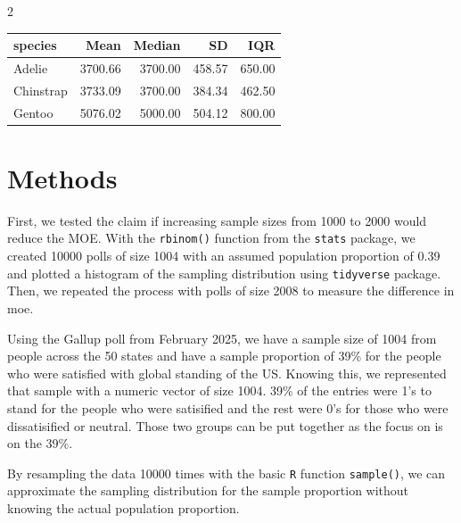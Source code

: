 \documentclass{article}\usepackage[]{graphicx}\usepackage[]{xcolor}
\newenvironment{Figure}
  {\par\medskip\noindent\minipage{\linewidth}}
  {\endminipage\par\medskip}
\begin{document}
\begin{multicols}{2}
\begin{Figure}
\centering
\begin{tabular}{lrrrr}
  \hline
species & Mean & Median & SD & IQR \\ 
  \hline
Adelie & 3700.66 & 3700.00 & 458.57 & 650.00 \\ 
  Chinstrap & 3733.09 & 3700.00 & 384.34 & 462.50 \\ 
  Gentoo & 5076.02 & 5000.00 & 504.12 & 800.00 \\ 
   \hline
\end{tabular}
\label{tab:penguins}
\end{Figure}

\section{Methods}
First, we tested the claim if increasing sample sizes from 1000 to 2000 would reduce the MOE. With the \texttt{rbinom()} function from the \texttt{stats} \citep{stats} package, we created 10000 polls of size 1004 with an assumed population proportion of 0.39 and plotted a histogram of the sampling distribution using \texttt{tidyverse} \citep{tidyverse} package. Then, we repeated the process with polls of size 2008 to measure the difference in moe. 

Using the Gallup poll from February 2025, we have a sample size of 1004 from people across the 50 states and have a sample proportion of 39\% for the people who were satisfied with global standing of the US. Knowing this, we represented that sample with a numeric vector of size 1004. 39\% of the entries were 1's to stand for the people who were satisified and the rest were 0's for those who were dissatisified or neutral. Those two groups can be put together as the focus on is on the 39\%. 

By resampling the data 10000 times with the basic \texttt{R} function \texttt{sample()}, we can approximate the sampling distribution for the sample proportion without knowing the actual population proportion. 


\end{multicols}
\end{document}
